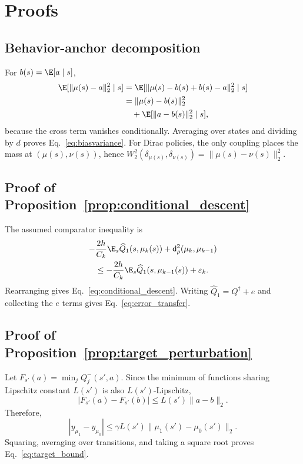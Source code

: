 \appendix

\section{Proofs}
\label{app:proofs}

\subsection{Behavior-anchor decomposition}
For $b(s)=\E[a\mid s]$,
\begin{align*}
\E[\|\mu(s)-a\|_2^2\mid s]
&=\E[\|\mu(s)-b(s)+b(s)-a\|_2^2\mid s]\\
&=\|\mu(s)-b(s)\|_2^2\\
&\quad+\E[\|a-b(s)\|_2^2\mid s],
\end{align*}
because the cross term vanishes conditionally. Averaging over states and dividing by $d$ proves Eq.~\eqref{eq:biasvariance}. For Dirac policies, the only coupling places the mass at $(\mu(s),\nu(s))$, hence $W_2^2(\delta_{\mu(s)},\delta_{\nu(s)})=\|\mu(s)-\nu(s)\|_2^2$.

\subsection{Proof of Proposition~\ref{prop:conditional_descent}}
The assumed comparator inequality is
\begin{align*}
-&\frac{2h}{C_k}\E_s\widehat Q_1(s,\mu_k(s))
+\mathsf d_\rho^2(\mu_k,\mu_{k-1})\\
&\leq-\frac{2h}{C_k}\E_s\widehat Q_1(s,\mu_{k-1}(s))+\varepsilon_k.
\end{align*}
Rearranging gives Eq.~\eqref{eq:conditional_descent}. Writing $\widehat Q_1=Q^\dagger+e$ and collecting the $e$ terms gives Eq.~\eqref{eq:error_transfer}.

\subsection{Proof of Proposition~\ref{prop:target_perturbation}}
Let $F_{s'}(a)=\min_jQ_j^-(s',a)$. Since the minimum of functions sharing Lipschitz constant $L(s')$ is also $L(s')$-Lipschitz,
\begin{equation*}
 |F_{s'}(a)-F_{s'}(b)|\leq L(s')\|a-b\|_2.
\end{equation*}
Therefore,
\begin{equation*}
 |y_{\mu_1}-y_{\mu_0}|\leq\gamma L(s')\|\mu_1(s')-\mu_0(s')\|_2.
\end{equation*}
Squaring, averaging over transitions, and taking a square root proves Eq.~\eqref{eq:target_bound}.

